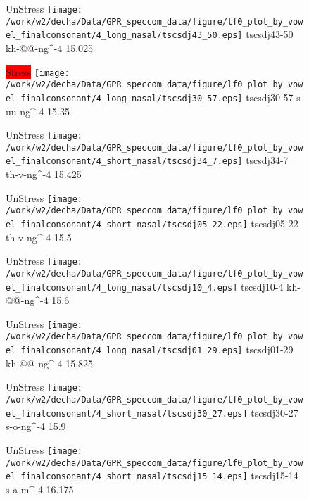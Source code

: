 \documentclass{article}
\begin{document}
\begin{figure}[t]
\begin{minipage}[b]{.24\textwidth}
UnStress
\centering
\texttt{[image: /work/w2/decha/Data/GPR\_speccom\_data/figure/lf0\_plot\_by\_vowel\_finalconsonant/4\_long\_nasal/tscsdj43\_50.eps]}
tscsdj43-50 kh-@@-ng\textasciicircum-4 15.025
\end{minipage}
\begin{minipage}[b]{.24\textwidth}
\colorbox{red}{Stress}
\centering
\texttt{[image: /work/w2/decha/Data/GPR\_speccom\_data/figure/lf0\_plot\_by\_vowel\_finalconsonant/4\_long\_nasal/tscsdj30\_57.eps]}
tscsdj30-57 s-uu-ng\textasciicircum-4 15.35
\end{minipage}
\begin{minipage}[b]{.24\textwidth}
UnStress
\centering
\texttt{[image: /work/w2/decha/Data/GPR\_speccom\_data/figure/lf0\_plot\_by\_vowel\_finalconsonant/4\_short\_nasal/tscsdj34\_7.eps]}
tscsdj34-7 th-v-ng\textasciicircum-4 15.425
\end{minipage}
\begin{minipage}[b]{.24\textwidth}
UnStress
\centering
\texttt{[image: /work/w2/decha/Data/GPR\_speccom\_data/figure/lf0\_plot\_by\_vowel\_finalconsonant/4\_short\_nasal/tscsdj05\_22.eps]}
tscsdj05-22 th-v-ng\textasciicircum-4 15.5
\end{minipage}
\end{figure}

\begin{figure}[t]
\begin{minipage}[b]{.24\textwidth}
UnStress
\centering
\texttt{[image: /work/w2/decha/Data/GPR\_speccom\_data/figure/lf0\_plot\_by\_vowel\_finalconsonant/4\_long\_nasal/tscsdj10\_4.eps]}
tscsdj10-4 kh-@@-ng\textasciicircum-4 15.6
\end{minipage}
\begin{minipage}[b]{.24\textwidth}
UnStress
\centering
\texttt{[image: /work/w2/decha/Data/GPR\_speccom\_data/figure/lf0\_plot\_by\_vowel\_finalconsonant/4\_long\_nasal/tscsdj01\_29.eps]}
tscsdj01-29 kh-@@-ng\textasciicircum-4 15.825
\end{minipage}
\begin{minipage}[b]{.24\textwidth}
UnStress
\centering
\texttt{[image: /work/w2/decha/Data/GPR\_speccom\_data/figure/lf0\_plot\_by\_vowel\_finalconsonant/4\_short\_nasal/tscsdj30\_27.eps]}
tscsdj30-27 s-o-ng\textasciicircum-4 15.9
\end{minipage}
\begin{minipage}[b]{.24\textwidth}
UnStress
\centering
\texttt{[image: /work/w2/decha/Data/GPR\_speccom\_data/figure/lf0\_plot\_by\_vowel\_finalconsonant/4\_short\_nasal/tscsdj15\_14.eps]}
tscsdj15-14 s-a-m\textasciicircum-4 16.175
\end{minipage}
\end{figure}
\end{document}
